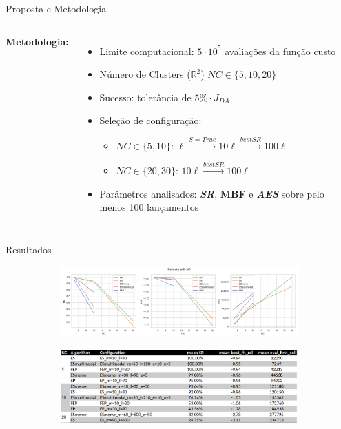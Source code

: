 \documentclass[pdf]{beamer}
\begin{document}
\begin{frame}{Proposta e Metodologia}
\begin{columns}
		\textbf{Metodologia:}
		\begin{itemize}
			\item Limite computacional: $ 5\cdot 10^5 $ avaliações da função custo
			\item Número de Clusters ($ \mathbb{R}^2 $) $ NC \in \{5, 10, 20\} $
			\item Sucesso: tolerância de $5\% \cdot J_{DA} $

			\item Seleção de configuração:
			\begin{itemize}
				\item $ NC \in \{5, 10\} $: $ \ell \xrightarrow{S = True} 10\ell \xrightarrow{best SR} 100 \ell$  
				\item $ NC \in \{20, 30\} $: $ 10\ell \xrightarrow{best SR} 100\ell$ 
			\end{itemize}
					\item Parâmetros analisados: \textit{\textbf{SR}}, \textbf{MBF} e \textit{\textbf{AES}} sobre pelo menos 100 lançamentos
		\end{itemize}		
	\end{columns}
\end{frame}


\begin{frame}{Resultados}
	\begin{figure}
		\begin{subfigure}[t]{\textwidth}
			\centering
			\includegraphics[width=\textwidth]{img/criteria_behavior_with_nc.png}
		\end{subfigure}
		\begin{subfigure}[t]{\textwidth}
			\centering
			\includegraphics[width=\textwidth]{img/tabela_resumo.png}
		\end{subfigure}
	\end{figure}
\end{frame}
\end{document}
